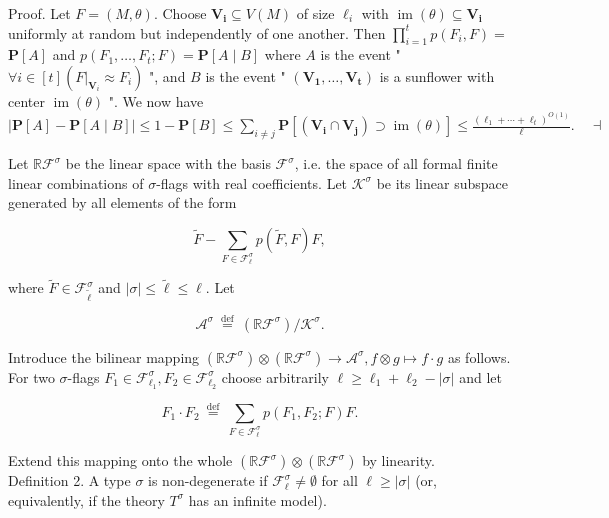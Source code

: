 \documentclass[10pt]{article}
\begin{document}
Proof. Let $F=(M, \theta)$. Choose $\boldsymbol{V}_{\boldsymbol{i}} \subseteq V(M)$ of size $\ell_{i}$ with $\operatorname{im}(\theta) \subseteq \boldsymbol{V}_{\boldsymbol{i}}$ uniformly at random but independently of one another. Then $\prod_{i=1}^{t} p\left(F_{i}, F\right)=$ $\mathbf{P}[A]$ and $p\left(F_{1}, \ldots, F_{t} ; F\right)=\mathbf{P}[A \mid B]$ where $A$ is the event " $\forall i \in[t]\left(\left.F\right|_{\boldsymbol{V}_{i}} \approx F_{i}\right)$ ", and $B$ is the event " $\left(\boldsymbol{V}_{\mathbf{1}}, \ldots, \boldsymbol{V}_{\boldsymbol{t}}\right)$ is a sunflower with center $\operatorname{im}(\theta)$ ". We now have $|\mathbf{P}[A]-\mathbf{P}[A \mid B]| \leq 1-\mathbf{P}[B] \leq \sum_{i \neq j} \mathbf{P}\left[\left(\boldsymbol{V}_{\boldsymbol{i}} \cap \boldsymbol{V}_{\boldsymbol{j}}\right) \supset \operatorname{im}(\theta)\right] \leq \frac{\left(\ell_{1}+\cdots+\ell_{t}\right)^{O(1)}}{\ell} . \quad \dashv$

Let $\mathbb{R} \mathcal{F}^{\sigma}$ be the linear space with the basis $\mathcal{F}^{\sigma}$, i.e. the space of all formal finite linear combinations of $\sigma$-flags with real coefficients. Let $\mathcal{K}^{\sigma}$ be its linear subspace generated by all elements of the form


\begin{equation*}
\widetilde{F}-\sum_{F \in \mathcal{F}_{\ell}^{\sigma}} p(\widetilde{F}, F) F, \tag{4}
\end{equation*}


where $\widetilde{F} \in \mathcal{F}_{\tilde{\ell}}^{\sigma}$ and $|\sigma| \leq \tilde{\ell} \leq \ell$. Let

$$
\mathcal{A}^{\sigma} \stackrel{\text { def }}{=}\left(\mathbb{R} \mathcal{F}^{\sigma}\right) / \mathcal{K}^{\sigma} .
$$

Introduce the bilinear mapping $\left(\mathbb{R} \mathcal{F}^{\sigma}\right) \otimes\left(\mathbb{R} \mathcal{F}^{\sigma}\right) \longrightarrow \mathcal{A}^{\sigma}, f \otimes g \mapsto f \cdot g$ as follows. For two $\sigma$-flags $F_{1} \in \mathcal{F}_{\ell_{1}}^{\sigma}, F_{2} \in \mathcal{F}_{\ell_{2}}^{\sigma}$ choose arbitrarily $\ell \geq \ell_{1}+\ell_{2}-|\sigma|$ and let


\begin{equation*}
F_{1} \cdot F_{2} \stackrel{\text { def }}{=} \sum_{F \in \mathcal{F}_{\ell}^{\sigma}} p\left(F_{1}, F_{2} ; F\right) F . \tag{5}
\end{equation*}


Extend this mapping onto the whole $\left(\mathbb{R} \mathcal{F}^{\sigma}\right) \otimes\left(\mathbb{R} \mathcal{F}^{\sigma}\right)$ by linearity.\\
Definition 2. A type $\sigma$ is non-degenerate if $\mathcal{F}_{\ell}^{\sigma} \neq \emptyset$ for all $\ell \geq|\sigma|$ (or, equivalently, if the theory $T^{\sigma}$ has an infinite model).
\end{document}

